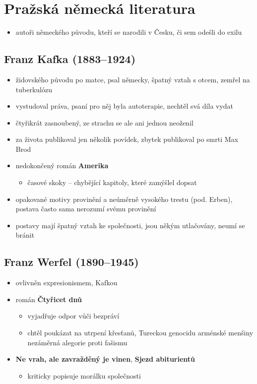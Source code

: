 \section{Pražská německá literatura}
\begin{itemize}
\item autoři německého původu, kteří se narodili v Česku, či sem odešli do exilu
\end{itemize}
\subsection{Franz Kafka (1883--1924)}
\begin{itemize}
\item židovského původu po matce, psal německy, špatný vztah s otcem, zemřel na tuberkulózu
\item vystudoval práva, psaní pro něj byla autoterapie, nechtěl svá díla vydat
\item čtyřikrát zasnoubený, ze strachu se ale ani jednou neoženil
\item za života publikoval jen několik povídek, zbytek publikoval po smrti Max Brod
\item nedokončený román \textbf{Amerika} 
	\begin{itemize}
	\item časové skoky -- chybějící kapitoly, které zamýšlel dopsat
	\end{itemize}
\item opakované motivy provinění a neúměrně vysokého trestu (pod. Erben), postava často sama nerozumí svému provinění
\item postavy mají špatný vztah ke společnosti, jsou někým utlačovány, neumí se bránit	

\end{itemize}

\subsection{Franz Werfel (1890--1945)}
\begin{itemize}
\item ovlivněn expresionismem, Kafkou
\item román \textbf{Čtyřicet dnů}
	\begin{itemize}
	\item vyjadřuje odpor vůči bezpráví 
	\item chtěl poukázat na utrpení křesťanů, Tureckou genocidu arménské menšiny \ra nezáměrná alegorie proti fašismu
	\end{itemize}
\item \textbf{Ne vrah, ale zavražděný je vinen}, \textbf{Sjezd abiturientů}
	\begin{itemize}
	\item kriticky popisuje morálku společnosti	
	\end{itemize}
\end{itemize}

